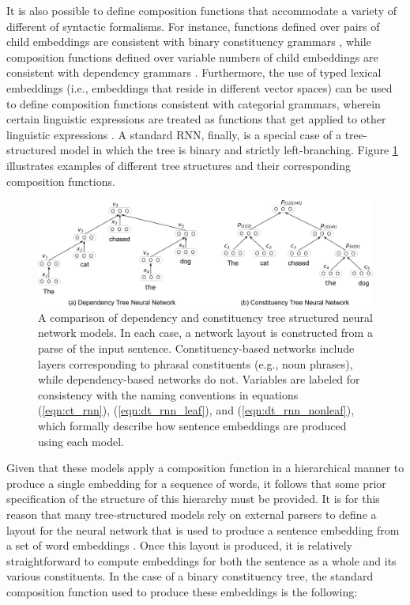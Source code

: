 It is also possible to define composition functions that accommodate a variety of different of syntactic formalisms. For instance, functions defined over pairs of child embeddings are consistent with binary constituency grammars \citep{Socher:2012}, while composition functions defined over variable numbers of child embeddings are consistent with dependency grammars \citep{Socher:2014,Tai:2015}. Furthermore, the use of typed lexical embeddings (i.e., embeddings that reside in different vector spaces) can be used to define composition functions consistent with categorial grammars, wherein certain linguistic expressions are treated as functions that get applied to other linguistic expressions \citep{Baroni:2014}. A standard RNN, finally, is a special case of a tree-structured model in which the tree is binary and strictly left-branching. Figure \ref{fig:tree-rnn} illustrates examples of different tree structures and their corresponding composition functions. 

\begin{figure}
\centering
	\includegraphics[width=6in]{figures/tree_comp.png}
	\caption{A comparison of dependency and constituency tree structured neural network models. In each case, a network layout is constructed from a parse of the input sentence. Constituency-based networks include layers corresponding to phrasal constituents (e.g., noun phrases), while dependency-based networks do not. Variables are labeled for consistency with the naming conventions in equations (\ref{eqn:ct_rnn}), (\ref{eqn:dt_rnn_leaf}), and (\ref{eqn:dt_rnn_nonleaf}), which formally describe how sentence embeddings are produced using each model.}
\label{fig:tree-rnn}
\end{figure}

Given that these models apply a composition function in a hierarchical manner to produce a single embedding for a sequence of words, it follows that some prior specification of the structure of this hierarchy must be provided. It is for this reason that many tree-structured models rely on external parsers to define a layout for the neural network that is used to produce a sentence embedding from a set of word embeddings \citep{Socher:2012,Socher:2014}. Once this layout is produced, it is relatively straightforward to compute embeddings for both the sentence as a whole and its various constituents. In the case of a binary constituency tree, the standard composition function used to produce these embeddings is the following:

